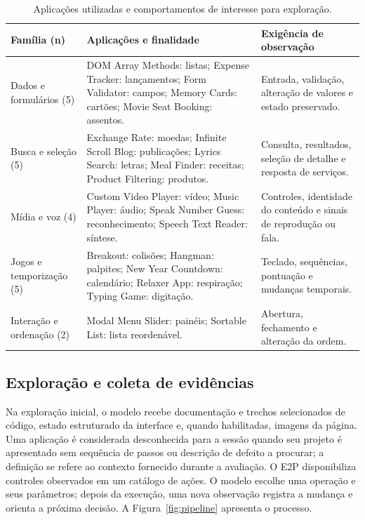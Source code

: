 \documentclass[12pt]{article}
\begin{document}
\begin{table}[ht]
\centering
\caption{Aplicações utilizadas e comportamentos de interesse para exploração.}
\label{tab:corpus}
\footnotesize
\begin{tabular}{>{\raggedright\arraybackslash}p{2.6cm}>{\raggedright\arraybackslash}p{6.4cm}>{\raggedright\arraybackslash}p{4.5cm}}
\toprule
Família (n) & Aplicações e finalidade & Exigência de observação\\
\midrule
Dados e formulários (5) & DOM Array Methods: listas; Expense Tracker: lançamentos; Form Validator: campos; Memory Cards: cartões; Movie Seat Booking: assentos. & Entrada, validação, alteração de valores e estado preservado.\\
Busca e seleção (5) & Exchange Rate: moedas; Infinite Scroll Blog: publicações; Lyrics Search: letras; Meal Finder: receitas; Product Filtering: produtos. & Consulta, resultados, seleção de detalhe e resposta de serviços.\\
Mídia e voz (4) & Custom Video Player: vídeo; Music Player: áudio; Speak Number Guess: reconhecimento; Speech Text Reader: síntese. & Controles, identidade do conteúdo e sinais de reprodução ou fala.\\
Jogos e temporização (5) & Breakout: colisões; Hangman: palpites; New Year Countdown: calendário; Relaxer App: respiração; Typing Game: digitação. & Teclado, sequências, pontuação e mudanças temporais.\\
Interação e ordenação (2) & Modal Menu Slider: painéis; Sortable List: lista reordenável. & Abertura, fechamento e alteração da ordem.\\
\bottomrule
\end{tabular}
\end{table}

\subsection{Exploração e coleta de evidências}
Na exploração inicial, o modelo recebe documentação e trechos selecionados de código, estado estruturado da interface e, quando habilitadas, imagens da página. Uma aplicação é considerada desconhecida para a sessão quando seu projeto é apresentado sem sequência de passos ou descrição de defeito a procurar; a definição se refere ao contexto fornecido durante a avaliação. O E2P disponibiliza controles observados em um catálogo de ações. O modelo escolhe uma operação e seus parâmetros; depois da execução, uma nova observação registra a mudança e orienta a próxima decisão. A Figura~\ref{fig:pipeline} apresenta o processo.
\end{document}
